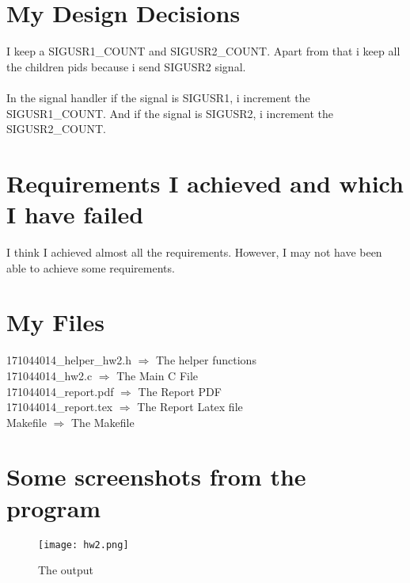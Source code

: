 \documentclass[20pt]{article}
\begin{document}
\section{My Design Decisions}
I keep a SIGUSR1\_COUNT and SIGUSR2\_COUNT. Apart from that i keep all the children pids because i send SIGUSR2 signal.
\\\\
In the signal handler if the signal is SIGUSR1, i increment the SIGUSR1\_COUNT. And if the signal is SIGUSR2, i increment the SIGUSR2\_COUNT.

\section{Requirements I achieved and which I have failed}
I think I achieved almost all the requirements. However, I may not have been able to achieve some requirements.

\section{My Files}
171044014\_helper\_hw2.h $\Rightarrow$ The helper functions \\
171044014\_hw2.c $\Rightarrow$ The Main C File \\
171044014\_report.pdf $\Rightarrow$ The Report PDF \\
171044014\_report.tex $\Rightarrow$ The Report Latex file \\
Makefile $\Rightarrow$ The Makefile \\

\section{Some screenshots from the program}
\begin{figure}[h!]
  \texttt{[image: hw2.png]}
  \caption{The output}
  \label{fig:code}
\end{figure}
\end{document}

